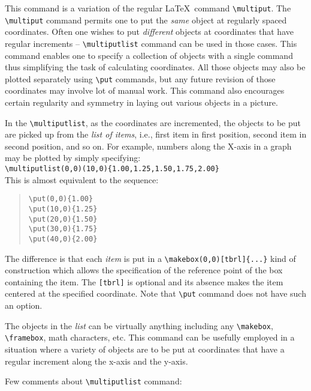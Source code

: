 This command is a variation of the regular \LaTeX\ command \verb|\multiput|.
The \verb|\multiput| command permits one to put the {\it same\/} object
at regularly spaced coordinates. Often one wishes to put {\it different\/}
objects at coordinates that have regular increments -- \verb|\multiputlist|
command can be used in those cases. This command enables one to specify a
collection of objects with a single command thus simplifying the task of
calculating coordinates. All those objects may also be plotted separately
using \verb|\put| commands, but any future revision of those coordinates
may involve lot of manual work. This command also encourages certain
regularity and symmetry in laying out various objects in a picture.

In the \verb|\multiputlist|, as the coordinates are incremented, the objects
to be put are picked up from the {\it list of items\/},
i.e., first item in first position, second item in second position, and so on.
For example, numbers along the X-axis in a graph may be plotted by simply
specifying:\\[2mm]
\hspace*{\leftmargin}%
\verb|\multiputlist(0,0)(10,0){1.00,1.25,1.50,1.75,2.00}| \\[2mm]
This is almost equivalent to the sequence:
\begin{quote}
\begin{verbatim}
\put(0,0){1.00}
\put(10,0){1.25}
\put(20,0){1.50}
\put(30,0){1.75}
\put(40,0){2.00}
\end{verbatim}
\end{quote}

The difference is that each {\it item\/} is put in a
\verb|\makebox(0,0)[tbrl]{...}| kind of construction which 
allows the specification of
the reference point of the box containing the item. The \verb|[tbrl]|
is optional and its absence makes the item centered at the specified
coordinate. Note that \verb|\put| command does not have such an option.

The objects in the {\it list\/} can be virtually anything including any
\verb|\makebox|, \verb|\framebox|, math characters, etc. This command can be
usefully employed in a situation where a variety of objects are
to be put at coordinates that have a regular increment along the x-axis and
the y-axis.

Few comments about \verb|\multiputlist| command:

